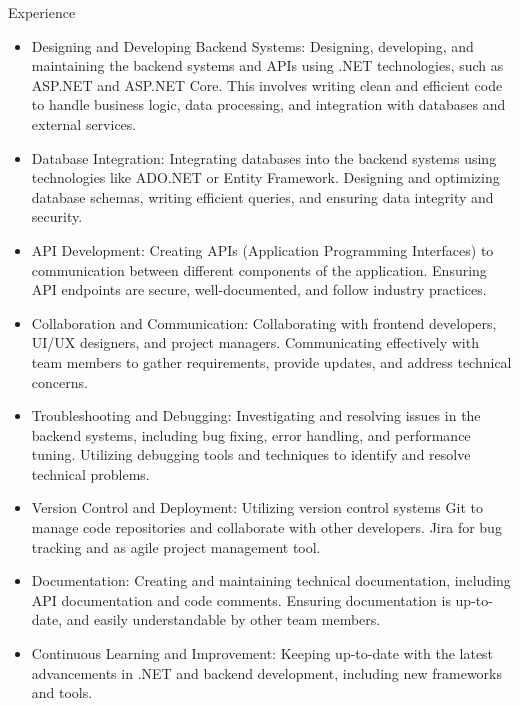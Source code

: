 \documentclass{resume} %
\begin{document}
\introduction[
    fullname=Rineesh C H,
    email=rineeshch04@gmail.com,
    phone=+91-9037112066,
    linkedin=linkedin.com/in/rineeshch/,
    github=github.com/rineeshch
]



\begin{workSection}{Experience}
    \experienceItem[
        company=Vxceed Software Solutions Pvt. Ltd.,
        location=Bengaluru,
        position=Product Engineer,
        duration=Jun 2023 – Present
    ]
     \begin{itemize}
        \itemsep -6pt {} 

        \item Designing and Developing Backend Systems: Designing, developing, and maintaining the backend systems and APIs using .NET technologies, such as ASP.NET and ASP.NET Core. This involves writing clean and efficient code to handle business logic, data processing, and integration with databases and external services.
        \item Database Integration: Integrating databases into the backend systems using technologies like ADO.NET or Entity Framework. Designing and optimizing database schemas, writing efficient queries, and ensuring data integrity and security.
        \item API Development: Creating APIs (Application Programming Interfaces) to communication between different components of the application. Ensuring API endpoints are secure, well-documented, and follow industry practices.
        \item Collaboration and Communication: Collaborating with frontend developers, UI/UX designers, and project managers. Communicating effectively with team members to gather requirements, provide updates, and address technical concerns.
        \item Troubleshooting and Debugging: Investigating and resolving issues in the backend systems, including bug fixing, error handling, and performance tuning. Utilizing debugging tools and techniques to identify and resolve technical problems.
        \item Version Control and Deployment: Utilizing version control systems Git to manage code repositories and collaborate with other developers. Jira for bug tracking and as agile project management tool.
        \item Documentation: Creating and maintaining technical documentation, including API documentation and code comments. Ensuring documentation is up-to-date, and easily understandable by other team members.
        \item Continuous Learning and Improvement: Keeping up-to-date with the latest advancements in .NET and backend development, including new frameworks and tools. 
     \end{itemize}
     

\end{workSection}
\end{document}
